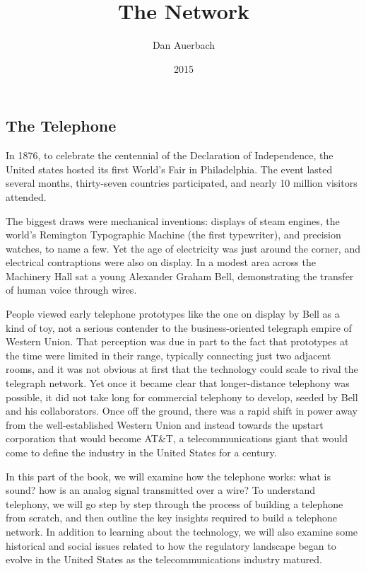 \documentclass[UTF8]{book}
\begin{document}
\begin{CJK}{UTF8}{gbsn}

\title{The Network}
\author{Dan Auerbach}
\date{2015}
\maketitle

\part{The Telephone}

In 1876, to celebrate the centennial of the Declaration of Independence, the United states hosted its first World's Fair in Philadelphia. The event lasted several months, thirty-seven countries participated, and nearly 10 million visitors attended.

The biggest draws were mechanical inventions: displays of steam engines, the world's Remington Typographic Machine (the first typewriter), and precision watches, to name a few. Yet the age of electricity was just around the corner, and electrical contraptions were also on display. In a modest area across the Machinery Hall sat a young Alexander Graham Bell, demonstrating the transfer of human voice through wires.

People viewed early telephone prototypes like the one on display by Bell as a kind of toy, not a serious contender to the business-oriented telegraph empire of Western Union. That perception was due in part to the fact that prototypes at the time were limited in their range, typically connecting just two adjacent rooms, and it was not obvious at first that the technology could scale to rival the telegraph network. Yet once it became clear that longer-distance telephony was possible, it did not take long for commercial telephony to develop, seeded by Bell and his collaborators. Once off the ground, there was a rapid shift in power away from the well-established Western Union and instead towards the upstart corporation that would become AT\&T, a telecommunications giant that would come to define the industry in the United States for a century.

In this part of the book, we will examine how the telephone works: what is sound? how is an analog signal transmitted over a wire? To understand telephony, we will go step by step through the process of building a telephone from scratch, and then outline the key insights required to build a telephone network. In addition to learning about the technology, we will also examine some historical and social issues related to how the regulatory landscape began to evolve in the United States as the telecommunications industry matured.


\end{CJK}
\end{document}
